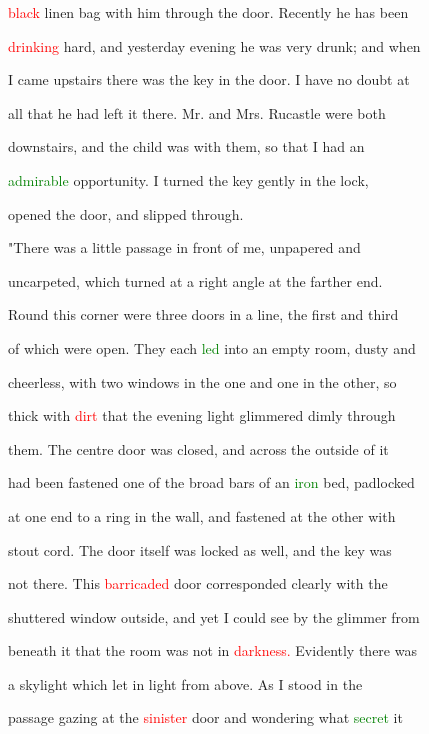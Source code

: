  \textcolor{red}{black} linen bag with him through the door. Recently he has been

 \textcolor{red}{drinking} hard, and yesterday evening he was very drunk; and when

 I came upstairs there was the key in the door. I have no \textcolor{BurntOrange}{doubt} at

 all that he had left it there. Mr. and Mrs. Rucastle were both

 downstairs, and the \textcolor{BurntOrange}{child} was with them, so that I had an

 \textcolor{green}{admirable} \textcolor{BurntOrange}{opportunity.} I turned the key gently in the lock,

 opened the door, and \textcolor{BurntOrange}{slipped} through.



 "There was a little passage in front of me, unpapered and

 uncarpeted, which turned at a right angle at the farther end.

 Round this corner were three doors in a line, the first and third

 of which were open. They each \textcolor{green}{led} into an empty room, dusty and

 cheerless, with two windows in the one and one in the other, so

 thick with \textcolor{red}{dirt} that the evening light \textcolor{BurntOrange}{glimmered} dimly through

 them. The centre door was closed, and across the outside of it

 had been fastened one of the broad bars of an \textcolor{green}{iron} bed, padlocked

 at one end to a ring in the wall, and fastened at the other with

 stout cord. The door itself was locked as well, and the key was

 not there. This \textcolor{red}{barricaded} door corresponded clearly with the

 shuttered window outside, and yet I could see by the \textcolor{BurntOrange}{glimmer} from

 beneath it that the room was not in \textcolor{red}{darkness.} Evidently there was

 a skylight which let in light from above. As I stood in the

 passage gazing at the \textcolor{red}{sinister} door and wondering what \textcolor{green}{secret} it

